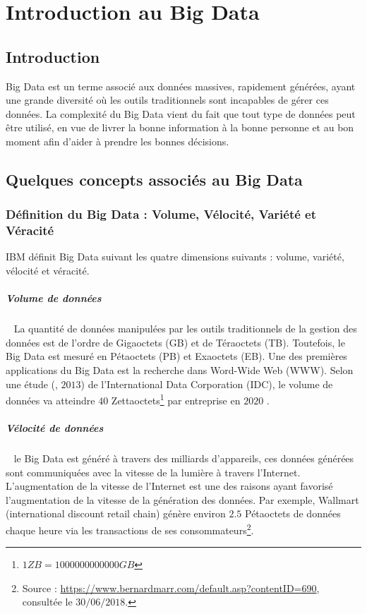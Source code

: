\chapter{Introduction au Big Data}
	
	\section{Introduction}
	
	Big Data est un terme associé aux données massives, rapidement générées, ayant une grande diversité où les  outils traditionnels sont incapables de gérer ces données. La complexité du Big Data vient du fait que tout type de données peut être utilisé, en vue de livrer la bonne information à la bonne personne et au bon moment afin d'aider à prendre les bonnes décisions.
	
	
	\section{Quelques concepts associés au Big Data}
		\subsection{Définition du Big Data : Volume, Vélocité, Variété et Véracité}
		
		IBM définit Big Data suivant les quatre dimensions suivants : volume, variété, vélocité et véracité. 
		\paragraph{Volume de données}~
		La quantité de données manipulées par les outils traditionnels de la gestion des données est de l'ordre de Gigaoctets (GB) et de Téraoctets (TB). Toutefois, le Big Data est mesuré en Pétaoctets (PB) et Exaoctets (EB). Une des premières applications du Big Data est la recherche dans Word-Wide Web (WWW). Selon une étude (\cite{6567202}, $2013$) de l'International Data Corporation (IDC), le volume de données  va atteindre $40$ Zettaoctets\footnote{ $ 1 ZB = 1000000000000 GB $} par  entreprise en $2020$ .
		
		\paragraph{Vélocité de données} ~
		le Big Data est généré à travers des milliards
		d'appareils, ces données générées sont communiquées avec la vitesse de la lumière à travers l'Internet. L'augmentation de la vitesse de l'Internet est une  des raisons ayant favorisé l'augmentation de la vitesse de la génération des données.	
		Par exemple, Wallmart (international discount retail chain) génère environ   $2.5$ Pétaoctets de données chaque  heure via les transactions de ses consommateurs\footnote{Source : \url{https://www.bernardmarr.com/default.asp?contentID=690}, consultée le $ 30/06/2018 $.}.
		
